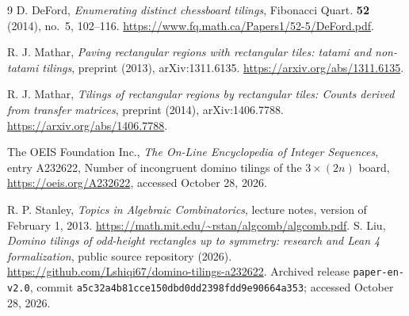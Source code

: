 \begin{thebibliography}{9}
D. DeFord, \emph{Enumerating distinct chessboard tilings},
Fibonacci Quart. \textbf{52} (2014), no.~5, 102--116.
\url{https://www.fq.math.ca/Papers1/52-5/DeFord.pdf}.

R. J. Mathar, \emph{Paving rectangular regions with rectangular
tiles: tatami and non-tatami tilings}, preprint (2013),
arXiv:1311.6135.
\url{https://arxiv.org/abs/1311.6135}.

R. J. Mathar, \emph{Tilings of rectangular regions by rectangular
tiles: Counts derived from transfer matrices}, preprint (2014),
arXiv:1406.7788.
\url{https://arxiv.org/abs/1406.7788}.

The OEIS Foundation Inc., \emph{The On-Line Encyclopedia of
Integer Sequences}, entry A232622,
Number of incongruent domino tilings of the $3\times(2n)$ board,
\url{https://oeis.org/A232622}, accessed October 28, 2026.

R. P. Stanley, \emph{Topics in Algebraic Combinatorics},
lecture notes, version of February 1, 2013.
\url{https://math.mit.edu/~rstan/algcomb/algcomb.pdf}.
S. Liu, \emph{Domino tilings of odd-height rectangles up to symmetry:
research and Lean 4 formalization}, public source repository (2026).
\url{https://github.com/Lshiqi67/domino-tilings-a232622}.
Archived release \texttt{paper-en-v2.0}, commit
\texttt{a5c32a4b81cce150dbd0dd2398fdd9e90664a353};
accessed October 28, 2026.
\end{thebibliography}
